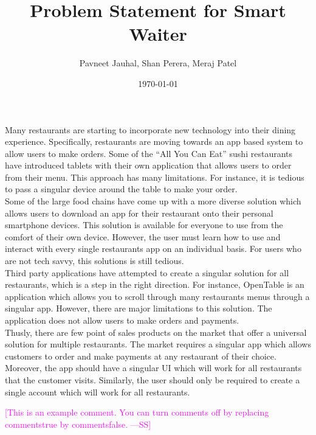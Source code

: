 \documentclass[12pt]{article}
\newcommand{\authornote}[3]{\textcolor{#1}{[#3 ---#2]}}
\newcommand{\authornote}[3]{}
\newcommand{\wss}[1]{\authornote{magenta}{SS}{#1}}
\begin{document}
\title{Problem Statement for Smart Waiter} 
\author{Pavneet Jauhal, Shan Perera, Meraj Patel}
\date{\today}

\maketitle

	Many restaurants are starting to incorporate new technology into their dining experience. Specifically, restaurants are moving towards an app based system to allow users to make orders. Some of the ``All You Can Eat'' sushi restaurants have introduced tablets with their own application that allows users to order from their menu. This approach has many limitations. For instance, it is tedious to pass a singular device around the table to make your order. \\
	
	Some of the large food chains have come up with a more diverse solution which allows users to download an app for their restaurant onto their personal smartphone devices. This solution is available for everyone to use from the comfort of their own device. However, the user must learn how to use and interact with every single restaurants app on an individual basis.  For users who are not tech savvy, this solutions is still tedious.\\
	
	Third party applications have attempted to create a singular solution for all restaurants, which is a step in the right direction. For instance, OpenTable is an application which allows you to scroll through many restaurants menus through a singular app. However, there are major limitations to this solution. The application does not allow users to make orders and payments.\\
	
	Thusly, there are few point of sales products on the market that offer a universal solution for multiple restaurants.  The market requires a singular app which allows customers to order and make payments at any restaurant of their choice. Moreover, the app should have a singular UI which will work for all restaurants that the customer visits. Similarly, the user should only be required to create a single account which will work for all restaurants.


\wss{This is an example comment.  You can turn comments off by replacing
  commentstrue by commentsfalse.}
\end{document}
